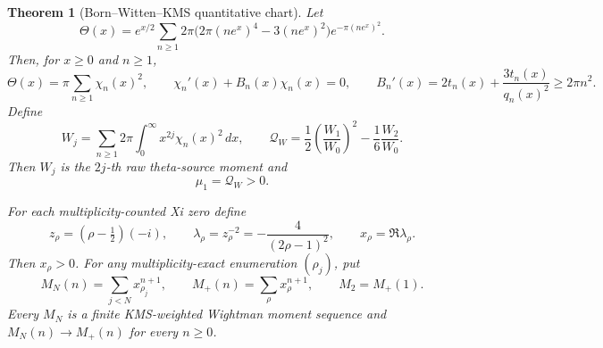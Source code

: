 \documentclass[11pt]{article}
\newtheorem{theorem}{Theorem}[section]
\begin{document}
\begin{theorem}[Born--Witten--KMS quantitative chart]
\label{thm:thermal-master}
Let
\[
 \Theta(x)=e^{x/2}\sum_{n\ge1}
 2\pi\bigl(2\pi(ne^x)^4-3(ne^x)^2\bigr)e^{-\pi(ne^x)^2}.
 \tag{9.14}
\]
Then, for $x\ge0$ and $n\ge1$,
\[
 \Theta(x)=\pi\sum_{n\ge1}\chi_n(x)^2,\qquad
 \chi_n'(x)+B_n(x)\chi_n(x)=0,\qquad
 B_n'(x)=2t_n(x)+\frac{3t_n(x)}{q_n(x)^2}\ge2\pi n^2.
 \tag{9.15}
\]
Define
\[
 W_j=\sum_{n\ge1}2\pi\int_0^\infty x^{2j}\chi_n(x)^2\,dx,\qquad
 \mathcal Q_W=\frac12\left(\frac{W_1}{W_0}\right)^2
              -\frac16\frac{W_2}{W_0}.
 \tag{9.16}
\]
Then $W_j$ is the $2j$-th raw theta-source moment and
\[
 \mu_1=\mathcal Q_W>0.
 \tag{9.17}
\]

For each multiplicity-counted Xi zero define
\[
 z_\rho=(\rho-\tfrac12)(-i),\qquad
 \lambda_\rho=z_\rho^{-2}=-\frac4{(2\rho-1)^2},
 \qquad x_\rho=\Re\lambda_\rho.
 \tag{9.18}
\]
Then $x_\rho>0$.  For any multiplicity-exact enumeration $(\rho_j)$, put
\[
 M_N(n)=\sum_{j<N}x_{\rho_j}^{n+1},\qquad
 M_+(n)=\sum_\rho x_\rho^{n+1},\qquad M_2=M_+(1).
 \tag{9.19}
\]
Every $M_N$ is a finite KMS-weighted Wightman moment sequence and $M_N(n)\to M_+(n)$ for every
$n\ge0$.


\end{theorem}
\end{document}
